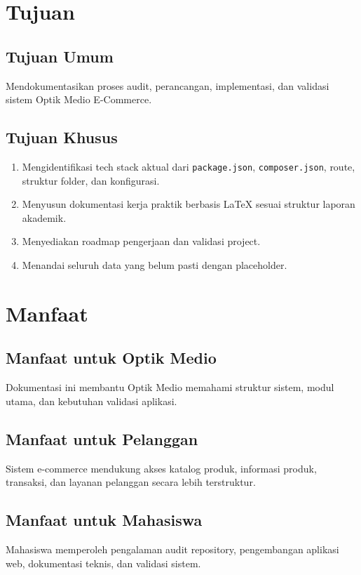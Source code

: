 \documentclass[12pt,a4paper]{report}
\begin{document}
\section{Tujuan}
\subsection{Tujuan Umum}
Mendokumentasikan proses audit, perancangan, implementasi, dan validasi sistem Optik Medio E-Commerce.

\subsection{Tujuan Khusus}
\begin{enumerate}
    \item Mengidentifikasi tech stack aktual dari \texttt{package.json}, \texttt{composer.json}, route, struktur folder, dan konfigurasi.
    \item Menyusun dokumentasi kerja praktik berbasis LaTeX sesuai struktur laporan akademik.
    \item Menyediakan roadmap pengerjaan dan validasi project.
    \item Menandai seluruh data yang belum pasti dengan placeholder.
\end{enumerate}

\section{Manfaat}
\subsection{Manfaat untuk Optik Medio}
Dokumentasi ini membantu Optik Medio memahami struktur sistem, modul utama, dan kebutuhan validasi aplikasi.

\subsection{Manfaat untuk Pelanggan}
Sistem e-commerce mendukung akses katalog produk, informasi produk, transaksi, dan layanan pelanggan secara lebih terstruktur.

\subsection{Manfaat untuk Mahasiswa}
Mahasiswa memperoleh pengalaman audit repository, pengembangan aplikasi web, dokumentasi teknis, dan validasi sistem.
\end{document}
